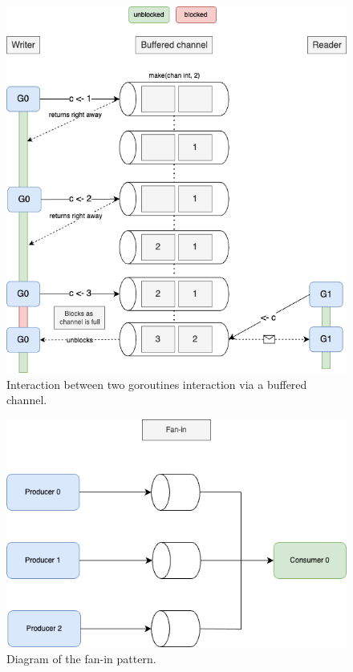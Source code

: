\documentclass[
  digital,
  color,
  oneside,
  nosansbold,
  nocolorbold,
  nolof,
  nolot,
]{fithesis4}
\begin{document}
\begin{figure}[H]
    \centering
    \includegraphics[width=12cm]{figures/buffered-full.png}
    \caption{Interaction between two goroutines interaction via a buffered channel.}
    \label{fig:goroutine-interactions}
\end{figure}

\begin{figure}[H]
    \centering
    \includegraphics[width=12cm]{figures/fanin.png}
    \caption{Diagram of the fan-in pattern.}
    \label{fig:fanin}
\end{figure}
\end{document}
